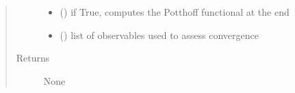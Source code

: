 \documentclass[letterpaper,10pt,english]{sphinxmanual}
\begin{document}
\begin{fulllineitems}
\begin{quote}
\begin{description}
\begin{itemize}
\item {} 
\sphinxAtStartPar
{} () \textendash{} if True, computes the Potthoff functional at the end

\item {} 
\sphinxAtStartPar
{}\sphinxstyleliteralstrong{\sphinxupquote{{]}}} (\sphinxstyleliteralemphasis{\sphinxupquote{{[}}}) \textendash{} list of observables used to assess convergence

\end{itemize}

\item[{Returns}] \leavevmode
\sphinxAtStartPar
None

\end{description}\end{quote}

\end{fulllineitems}

\end{document}
